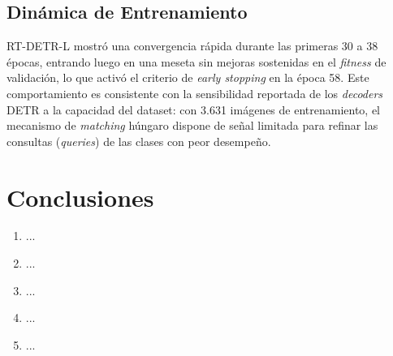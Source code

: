 \documentclass[conference]{IEEEtran}
\begin{document}
\subsection{Dinámica de Entrenamiento}

RT-DETR-L mostró una convergencia rápida durante las primeras 30 a 38 épocas,
entrando luego en una meseta sin mejoras sostenidas en el \textit{fitness} de
validación, lo que activó el criterio de \textit{early stopping} en la época
58. Este comportamiento es consistente con la sensibilidad reportada de los
\textit{decoders} DETR a la capacidad del dataset: con 3.631 imágenes de
entrenamiento, el mecanismo de \textit{matching} húngaro dispone de señal
limitada para refinar las consultas (\textit{queries}) de las clases con
peor desempeño.


\section{Conclusiones}


\begin{enumerate}
    \item ...
    \item ...
    \item ...
    \item ...
    \item ...
\end{enumerate}
\end{document}
